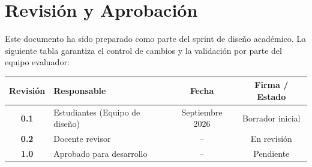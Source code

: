 \section*{Revisión y Aprobación}

Este documento ha sido preparado como parte del sprint de diseño académico. La siguiente tabla garantiza el control de cambios y la validación por parte del equipo evaluador:

\begin{table}[H]
    \centering
    \small
    \renewcommand{\arraystretch}{1.3}
    \begin{tabularx}{\linewidth}{|c|X|c|c|}
        \hline
        \rowcolor{gray!20}
        \textbf{Revisión} & \textbf{Responsable} & \textbf{Fecha} & \textbf{Firma / Estado} \\ \hline
        \textbf{0.1} & Estudiantes (Equipo de diseño) & Septiembre 2026 & Borrador inicial \\ \hline
        \textbf{0.2} & Docente revisor & -- & En revisión \\ \hline
        \textbf{1.0} & Aprobado para desarrollo & -- & Pendiente \\ \hline
    \end{tabularx}
\end{table}
